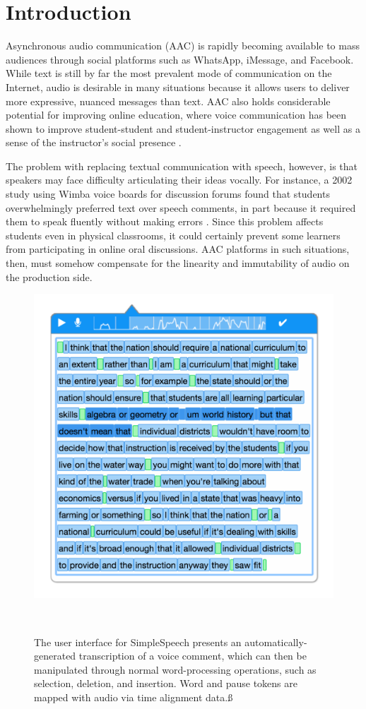 \section{Introduction}

Asynchronous audio communication (AAC) is rapidly becoming available to mass audiences through social platforms such as WhatsApp, iMessage, and Facebook. 
While text is still by far the most prevalent mode of communication on the Internet, audio is desirable in many situations because it allows users to deliver more expressive, nuanced messages than text.
AAC also holds considerable potential for improving online education, where voice communication has been shown to improve student-student and student-instructor engagement as well as a sense of the instructor's social presence \cite{ice,oomen,tu}. 

The problem with replacing textual communication with speech, however, is that speakers may face difficulty articulating their ideas vocally.
For instance, a 2002 study using Wimba voice boards for discussion forums found that students overwhelmingly preferred text over speech comments, in part because it required them to speak fluently without making errors \cite{wimba}.
Since this problem affects students even in physical classrooms, it could certainly prevent some learners from participating in online oral discussions.
AAC platforms in such situations, then, must somehow compensate for the linearity and immutability of audio on the production side.

\begin{figure}
	\centering
	\includegraphics[width=\columnwidth,keepaspectratio]{figures/large_screenshot}
	\caption{The user interface for SimpleSpeech presents an automatically-generated transcription of a voice comment, which can then be manipulated through normal word-processing operations, such as selection, deletion, and insertion. Word and pause tokens are mapped with audio via time alignment data.ß}~\label{fig:overview_shot}
\end{figure}

